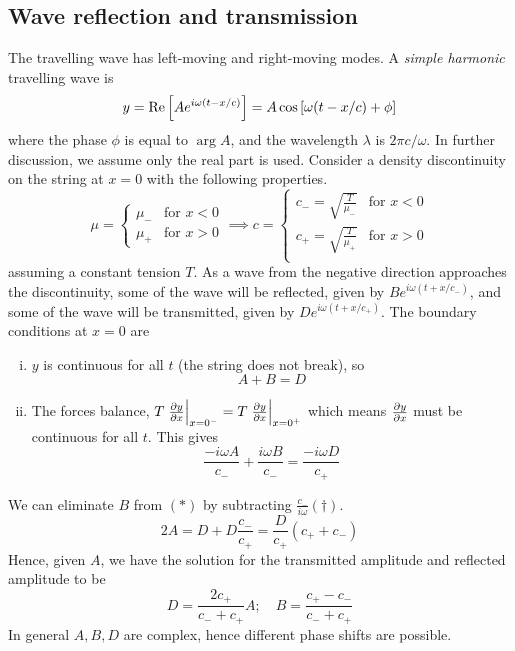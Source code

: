 \subsection{Wave reflection and transmission}
The travelling wave has left-moving and right-moving modes.
A \textit{simple harmonic} travelling wave is
\[
	y = \Re\qty[ A e^{i \omega(t-x/c)} ] = A \cos \qty[\omega(t-x/c) + \phi]
\]
where the phase \( \phi \) is equal to \( \arg A \), and the wavelength \( \lambda \) is \( 2 \pi c / \omega \).
In further discussion, we assume only the real part is used.
Consider a density discontinuity on the string at \( x = 0 \) with the following properties.
\[
	\mu = \begin{cases}
		\mu_- & \text{for } x < 0 \\
		\mu_+ & \text{for } x > 0
	\end{cases} \implies c = \begin{cases}
		c_- = \sqrt{\frac{T}{\mu_-}} & \text{for } x < 0 \\
		c_+ = \sqrt{\frac{T}{\mu_+}} & \text{for } x > 0 \\
	\end{cases}
\]
assuming a constant tension \( T \).
As a wave from the negative direction approaches the discontinuity, some of the wave will be reflected, given by \( B e^{i \omega(t + x/c_-)} \), and some of the wave will be transmitted, given by \( D e^{i \omega(t + x/c_+)} \).
The boundary conditions at \( x = 0 \) are
\begin{enumerate}[(i)]
	\item \( y \) is continuous for all \( t \) (the string does not break), so
	      \begin{equation}
		      A + B = D \tag{\(\ast\)}
	      \end{equation}
	\item The forces balance, \( T \eval{\pdv{y}{x}}_{x = 0^-} = T \eval{\pdv{y}{x}}_{x = 0^+} \) which means \( \pdv{y}{x} \) must be continuous for all \( t \).
	      This gives
	      \begin{equation}
		      \frac{-i\omega A}{c_-} + \frac{i \omega B}{c_-} = \frac{-i \omega D}{c_+} \tag{\(\dagger\)}
	      \end{equation}
\end{enumerate}
We can eliminate \( B \) from \( (\ast) \) by subtracting \( \frac{c_-}{i \omega}(\dagger) \).
\[
	2A = D + D \frac{c_-}{c_+} = \frac{D}{c_+}(c_+ + c_-)
\]
Hence, given \( A \), we have the solution for the transmitted amplitude and reflected amplitude to be
\[
	D = \frac{2 c_+}{c_- + c_+} A;\quad B = \frac{c_+ - c_-}{c_- + c_+}
\]
In general \( A, B, D \) are complex, hence different phase shifts are possible.

